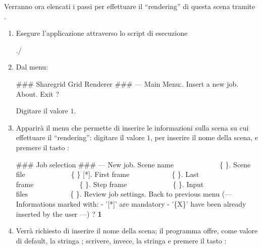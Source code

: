 Verranno ora elencati i passi per effettuare il ``rendering'' di questa scena tramite \mgTheApp{}.
\begin{enumerate}
\item Esegure l'applicazione \mgTheApp{} attraverso lo script di esecuzione 
\begin{mgCodeBox}
\small
./
\end{mgCodeBox}
\item Dal menu:
\begin{mgCodeBox}
\small
\#\#\# Sharegrid Grid Renderer \#\#\#\newline
--- Main Menu:. Insert a new job. About. Exit\newline
? 
\end{mgCodeBox}
Digitare il valore $1$.
\item Apparir\`a il menu che permette di inserire le informazioni sulla scena su cui effettuare il ``rendering'': digitare il valore $1$, per inserire il nome della scena, e premere il tasto :
\begin{mgCodeBox}
\small
\#\#\# Job selection \#\#\#\newline
--- New job. Scene name\ \ \ \ \ \ \ \ \ \ \ \ \ \{ \}. Scene file\ \ \ \ \ \ \ \ \ \ \ \ \ \{ \} [*]. First frame\ \ \ \ \ \ \ \ \ \ \ \ \{ \}. Last frame\ \ \ \ \ \ \ \ \ \ \ \ \ \{ \}. Step frame\ \ \ \ \ \ \ \ \ \ \ \ \ \{ \}. Input files\ \ \ \ \ \ \ \ \ \ \ \ \{ \}. Review job settings. Back to previous menu\newline
(---\newline
 Informations marked with:\newline
 - '[*]' are mandatory\newline
 - '\{X\}' have been already inserted by the user\newline
---)\newline
? \textbf{1}
\end{mgCodeBox}
\item Verr\`a richiesto di inserire il nome della scena; il programma offre, come valore di default, la stringa ; scrivere, invece, la stringa  e premere il tasto :

\end{enumerate}
